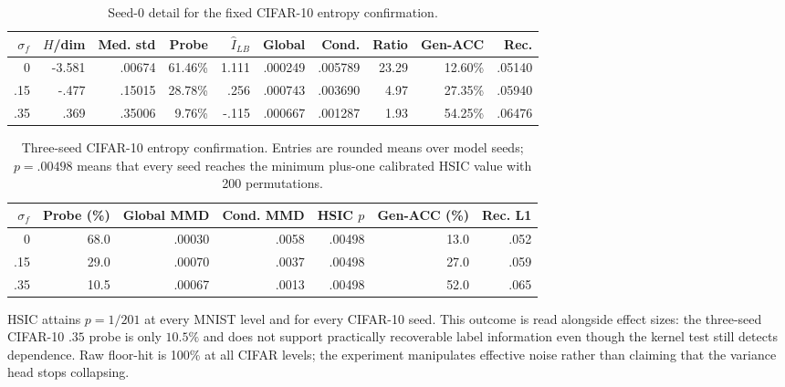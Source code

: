 \begin{table}[ht]
\caption{Seed-0 detail for the fixed CIFAR-10 entropy confirmation.}
\label{tab:entropy-cifar-full-v9}
\centering
\scriptsize
\setlength{\tabcolsep}{3.2pt}
\begin{tabular}{rrrrrrrrrr}
\toprule
$\sigma_f$ & $H$/dim & Med. std & Probe & $\widehat I_{LB}$ & Global & Cond. & Ratio & Gen-ACC & Rec. \\
\midrule
0 & -3.581 & .00674 & 61.46\% & 1.111 & .000249 & .005789 & 23.29 & 12.60\% & .05140 \\
.15 & -.477 & .15015 & 28.78\% & .256 & .000743 & .003690 & 4.97 & 27.35\% & .05940 \\
.35 & .369 & .35006 & 9.76\% & -.115 & .000667 & .001287 & 1.93 & 54.25\% & .06476 \\
\bottomrule
\end{tabular}
\end{table}

\begin{table}[ht]
\caption{Three-seed CIFAR-10 entropy confirmation.  Entries are rounded means
over model seeds; $p=.00498$ means that every seed reaches the minimum
plus-one calibrated HSIC value with 200 permutations.}
\label{tab:entropy-cifar-aggregate-v9}
\centering
\scriptsize
\setlength{\tabcolsep}{4pt}
\begin{tabular}{rrrrrrr}
\toprule
$\sigma_f$ & Probe (\%) & Global MMD & Cond. MMD & HSIC $p$ & Gen-ACC (\%) & Rec. L1 \\
\midrule
0 & 68.0 & .00030 & .0058 & .00498 & 13.0 & .052 \\
.15 & 29.0 & .00070 & .0037 & .00498 & 27.0 & .059 \\
.35 & 10.5 & .00067 & .0013 & .00498 & 52.0 & .065 \\
\bottomrule
\end{tabular}
\end{table}

HSIC attains $p=1/201$ at every MNIST level and for every CIFAR-10 seed.  This
outcome is read alongside effect sizes: the three-seed CIFAR-10 $.35$ probe is
only $10.5\%$ and does not support practically recoverable label information
even though the kernel test still detects dependence.  Raw floor-hit is 100\%
at all CIFAR levels;
the experiment manipulates effective noise rather than claiming that the
variance head stops collapsing.

